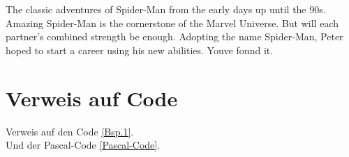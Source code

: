 The classic adventures of Spider-Man from the early days up until the 90s. Amazing Spider-Man is the cornerstone of the Marvel Universe. But will each partner’s combined strength be enough. Adopting the name Spider-Man, Peter hoped to start a career using his new abilities. Youve found it.

\section{Verweis auf Code}
Verweis auf den Code \ref{Bsp.1}.\\
Und der Pascal-Code \ref{Pascal-Code}.
